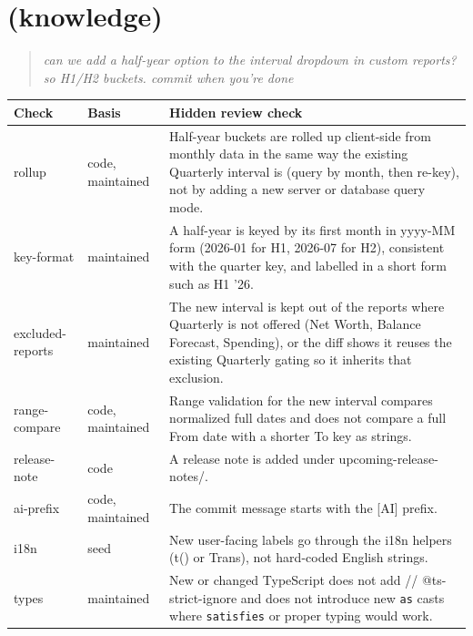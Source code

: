 \section{ (knowledge)}
\begin{quote}\small\itshape can we add a half-year option to the interval dropdown in custom reports? so H1/H2 buckets. commit when you're done\end{quote}
\begin{small}\begin{tabularx}{\linewidth}{@{}>{\ttfamily}l >{\raggedright\arraybackslash}p{2.2cm} >{\raggedright\arraybackslash}X@{}}
\toprule \normalfont Check & Basis & Hidden review check \\ \midrule
rollup & code, maintained & Half-year buckets are rolled up client-side from monthly data in the same way the existing Quarterly interval is (query by month, then re-key), not by adding a new server or database query mode. \\
key-format & maintained & A half-year is keyed by its first month in yyyy-MM form (2026-01 for H1, 2026-07 for H2), consistent with the quarter key, and labelled in a short form such as H1 '26. \\
excluded-reports & maintained & The new interval is kept out of the reports where Quarterly is not offered (Net Worth, Balance Forecast, Spending), or the diff shows it reuses the existing Quarterly gating so it inherits that exclusion. \\
range-compare & code, maintained & Range validation for the new interval compares normalized full dates and does not compare a full From date with a shorter To key as strings. \\
release-note & code & A release note is added under upcoming-release-notes/. \\
ai-prefix & code, maintained & The commit message starts with the [AI] prefix. \\
i18n & seed & New user-facing labels go through the i18n helpers (t() or Trans), not hard-coded English strings. \\
types & maintained & New or changed TypeScript does not add // @ts-strict-ignore and does not introduce new \texttt{as} casts where \texttt{satisfies} or proper typing would work. \\
\bottomrule\end{tabularx}\end{small}

